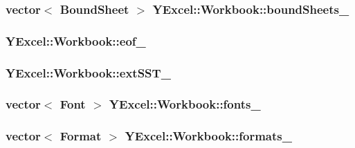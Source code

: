 \subsubsection[{bound\+Sheets\+\_\+}]{\setlength{\rightskip}{0pt plus 5cm}vector$<$ {\bf Bound\+Sheet} $>$ Y\+Excel\+::\+Workbook\+::bound\+Sheets\+\_\+}\label{class_y_excel_1_1_workbook_ab19f8d40e6b59a48c585ea5e47b690e0}
\hypertarget{class_y_excel_1_1_workbook_a621f6b35ae8b9fb9f2dbf7e6aaf65ddf}{}
\subsubsection[{eof\+\_\+}]{ Y\+Excel\+::\+Workbook\+::eof\+\_\+}\label{class_y_excel_1_1_workbook_a621f6b35ae8b9fb9f2dbf7e6aaf65ddf}
\hypertarget{class_y_excel_1_1_workbook_af31815fddd82ad2a701ac512554ccb40}{}
\subsubsection[{ext\+S\+S\+T\+\_\+}]{ Y\+Excel\+::\+Workbook\+::ext\+S\+S\+T\+\_\+}\label{class_y_excel_1_1_workbook_af31815fddd82ad2a701ac512554ccb40}
\hypertarget{class_y_excel_1_1_workbook_a52d5b091f5d1518c23ff0a3dae75f337}{}
\subsubsection[{fonts\+\_\+}]{\setlength{\rightskip}{0pt plus 5cm}vector$<$ {\bf Font} $>$ Y\+Excel\+::\+Workbook\+::fonts\+\_\+}\label{class_y_excel_1_1_workbook_a52d5b091f5d1518c23ff0a3dae75f337}
\hypertarget{class_y_excel_1_1_workbook_ad633901d0a8877218a752501cca49e34}{}
\subsubsection[{formats\+\_\+}]{\setlength{\rightskip}{0pt plus 5cm}vector$<$ {\bf Format} $>$ Y\+Excel\+::\+Workbook\+::formats\+\_\+}\label{class_y_excel_1_1_workbook_ad633901d0a8877218a752501cca49e34}
\hypertarget{class_y_excel_1_1_workbook_a5fd3f2b036672d6ef9d8208cc790a3c3}{}

